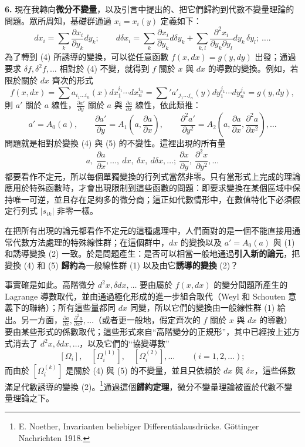 \documentclass[11pt]{article}
\newcommand{\srcemph}[1]{\textbf{#1}}
\newcommand{\srcnumdisplay}[2]{\begin{equation}\tag{#1}#2\end{equation}}
\begin{document}
\enlargethispage{3pt}
\textbf{6.} 現在我轉向\srcemph{微分不變量}，以及引言中提出的、把它們歸約到代數不變量理論的問題。眾所周知，基礎群通過 $x_i=x_i(y)$ 定義如下：
\srcnumdisplay{4}{d x_i=\sum_k \frac{\partial x_i}{\partial y_k}d y_k;\qquad
 d\delta x_i=\sum_k \frac{\partial x_i}{\partial y_k}d\delta y_k+
\sum_{k,l}\frac{\partial^2 x_i}{\partial y_k\partial y_l}d y_k\,\delta y_l;\ \ldots .}
為了轉到 (4) 所誘導的變換，可以從任意函數 $f(x,d x)=g(y,d y)$ 出發；通過要求 $\delta f,\delta^2f,\ldots$ 相對於 (4) 不變，就得到 $f$ 關於 $x$ 與 $d x$ 的導數的變換。例如，若限於關於 $d x$ 齊次的形式
\[
 f(x,d x)=\sum a_{i_1\ldots i_n}(x)d x_1^{i_1}\cdots d x_n^{i_n}
 =\sum{}' a'_{j_1\ldots j_n}(y)d y_1^{j_1}\cdots d y_n^{j_n}
 =g(y,d y),
\]
則 $a'$ 關於 $a$ 線性，$\frac{\partial a'}{\partial y}$ 關於 $a$ 與 $\frac{\partial a}{\partial x}$ 線性，依此類推：
\srcnumdisplay{5}{a'=A_0(a),\qquad
\frac{\partial a'}{\partial y}=A_1\!\left(a,\frac{\partial a}{\partial x}\right),\qquad
\frac{\partial^2 a'}{\partial y^2}=A_2\!\left(a,\frac{\partial a}{\partial x},\frac{\partial^2 a}{\partial x^2}\right),\ldots}
問題就是相對於變換 (4) 與 (5) 的不變性。這裡出現的所有量
\[
a,\ \frac{\partial a}{\partial x},\ldots,\ d x,\ \delta x,\ d\delta x,\ldots;\ 
\frac{\partial x}{\partial y},\ \frac{\partial^2 x}{\partial y^2},\ldots
\]
都要看作不定元，所以每個單獨變換的行列式當然非零。只有當形式上完成的理論應用於特殊函數時，才會出現限制到這些函數的問題：即要求變換在某個區域中保持唯一可逆，並且存在足夠多的微分商；這正如代數情形中，在數值特化下必須假定行列式 $|s_{ik}|$ 非零一樣。

在把所有出現的論元都看作不定元的這種處理中，人們面對的是一個不能直接用通常代數方法處理的特殊線性群；在這個群中，$d x$ 的變換以及 $a'=A_0(a)$ 與 (1) 和誘導變換 (2) 一致。於是問題產生：是否可以相當一般地通過\srcemph{引入新的論元}，把變換 (4) 和 (5) \srcemph{歸約}為一般線性群 (1) 以及由它\srcemph{誘導的變換} (2)？

事實確是如此。高階微分 $d^2x,\delta d x,\ldots$ 要由屬於 $f(x,d x)$ 的變分問題所產生的 Lagrange 導數取代，並由通過極化形成的進一步組合取代（Weyl 和 Schouten 意義下的聯絡）；所有這些量都同 $d x$ 同變，所以它們的變換由一般線性群 (1) 給出。另一方面，$\frac{\partial a}{\partial x},\frac{\partial^2a}{\partial x^2},\ldots$（或者更一般地，假定齊次的 $f$ 關於 $x$ 與 $d x$ 的導數）要由某些形式的係數取代；這些形式來自“高階變分的正規形”，其中已經按上述方式消去了 $d^2x,\delta d x,\ldots$，以及它們的“協變導數”
\[
 [\Omega_i],\quad [\Omega_i^{(1)}],\quad [\Omega_i^{(2)}],\ldots\qquad (i=1,2,\ldots);
\]
而由於 $[\Omega_i^{(k)}]$ 是關於 (4) 與 (5) 的不變量，並且只依賴於 $d x$ 與 $\delta x$，這些係數滿足代數誘導的變換 (2)。\footnote{E. Noether, Invarianten beliebiger Differentialausdrücke. Göttinger Nachrichten 1918.}通過這個\srcemph{歸約定理}，微分不變量理論被置於代數不變量理論之下。
\end{document}
